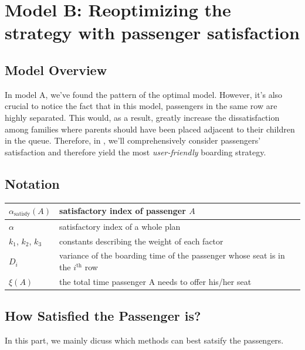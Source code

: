 \documentclass{article}
\theoremstyle{definition}
\theoremstyle{remark}
\numberwithin{equation}{section}
\begin{document}
	\section{Model B: Reoptimizing the strategy with passenger satisfaction}
	\subsection{Model Overview}
	In model A, we've found the pattern of the optimal model. However, it's also crucial to notice the fact that in this model, passengers in the same row are highly separated. This would, as a result, greatly increase the dissatisfaction among families where parents should have been placed adjacent to their children in the queue. Therefore, in , we'll comprehensively consider passengers' satisfaction and therefore yield the most \textit{user-friendly} boarding strategy.
	\subsection{Notation}
	\begin{center}
	\begin{tabular}{|l|l|}
		\hline
		$\alpha_\text{satisfy}(A)$&satisfactory index of passenger $A$\\
		\hline
		$\alpha$&satisfactory index of a whole plan\\
		\hline
		$k_1$, $k_2$, $k_3$&constants describing the weight of each factor\\
		\hline
		$D_i$&variance of the boarding time of the passenger whose seat is in the $i^\text{th}$ row\\
		\hline
		\(\xi\left(A\right)\) & the total time passenger A needs to offer his/her seat\\
		\hline
	\end{tabular}
	\end{center}
	\subsection{How Satisfied the Passenger is?}
	In this part, we mainly dicuss which methods can best satsify the passengers.
\end{document}
